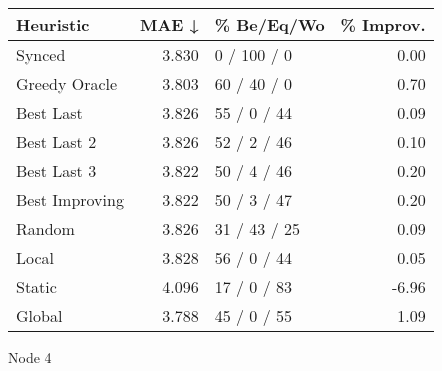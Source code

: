 \begin{tabular}{lrlr}
\toprule
\textbf{Heuristic} & \textbf{MAE ↓} & \textbf{\% Be/Eq/Wo} & \textbf{\% Improv.} \\
\midrule
            Synced &          3.830 &          0 / 100 / 0 &                0.00 \\
     Greedy Oracle &          3.803 &          60 / 40 / 0 &                0.70 \\
         Best Last &          3.826 &          55 / 0 / 44 &                0.09 \\
       Best Last 2 &          3.826 &          52 / 2 / 46 &                0.10 \\
       Best Last 3 &          3.822 &          50 / 4 / 46 &                0.20 \\
    Best Improving &          3.822 &          50 / 3 / 47 &                0.20 \\
            Random &          3.826 &         31 / 43 / 25 &                0.09 \\
             Local &          3.828 &          56 / 0 / 44 &                0.05 \\
            Static &          4.096 &          17 / 0 / 83 &               -6.96 \\
            Global &          3.788 &          45 / 0 / 55 &                1.09 \\
\bottomrule
\end{tabular}
\caption{Node 4}
\label{tab:ds_non_lr01_le2_bs4_4}
